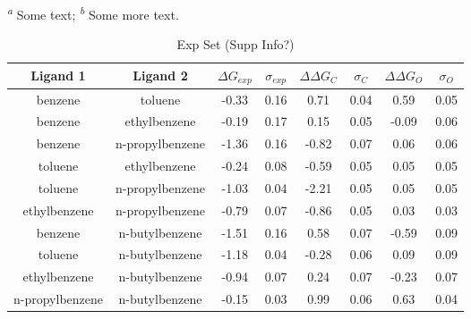 \documentclass[T4paper.tex]{subfiles}
\begin{document}
\begin{table}[!htb]
  \textsuperscript{\emph{a}} Some text;
  \textsuperscript{\emph{b}} Some more text.
\end{table}


\begin{table}[]
\centering
\caption{Exp Set (Supp Info?)}
\label{tbl:exp_set}
\begin{tabular}{|c|c|c|c|c|c|c|c|}
\hline
\textbf{Ligand 1} & \textbf{Ligand 2}  & \boldmath$\Delta G_{exp}$  & \boldmath$\sigma_{exp}$ & {\color[HTML]{800080} \boldmath$\Delta\Delta G_{C}$} & {\color[HTML]{800080} \boldmath$\sigma_{C}$} & {\color[HTML]{008000} \boldmath$\Delta\Delta G_{O}$} & {\color[HTML]{008000} \boldmath$\sigma_{O}$} \\ \hline
\cellcolor[HTML]{800080}benzene         & \cellcolor[HTML]{800080}toluene         & -0.33        & 0.16            & 0.71       & 0.04          & 0.59       & 0.05          \\ \hline
\cellcolor[HTML]{800080}benzene         & \cellcolor[HTML]{800080}ethylbenzene    & -0.19        & 0.17            & 0.15       & 0.05          & -0.09      & 0.06          \\ \hline
\cellcolor[HTML]{800080}benzene         & \cellcolor[HTML]{800080}n-propylbenzene & -1.36        & 0.16            & -0.82      & 0.07          & 0.06       & 0.06          \\ \hline
\cellcolor[HTML]{800080}toluene         & \cellcolor[HTML]{800080}ethylbenzene    & -0.24        & 0.08            & -0.59      & 0.05          & 0.05       & 0.05          \\ \hline
\cellcolor[HTML]{800080}toluene         & \cellcolor[HTML]{800080}n-propylbenzene & -1.03        & 0.04            & -2.21      & 0.05          & 0.05       & 0.05          \\ \hline
\cellcolor[HTML]{800080}ethylbenzene    & \cellcolor[HTML]{800080}n-propylbenzene & -0.79        & 0.07            & -0.86      & 0.05          & 0.03       & 0.03          \\ \hline
\cellcolor[HTML]{800080}benzene         & \cellcolor[HTML]{00FFFF}n-butylbenzene  & -1.51        & 0.16            & 0.58       & 0.07          & -0.59      & 0.09          \\ \hline
\cellcolor[HTML]{800080}toluene         & \cellcolor[HTML]{00FFFF}n-butylbenzene  & -1.18        & 0.04            & -0.28      & 0.06          & 0.09       & 0.09          \\ \hline
\cellcolor[HTML]{800080}ethylbenzene    & \cellcolor[HTML]{00FFFF}n-butylbenzene  & -0.94        & 0.07            & 0.24       & 0.07          & -0.23      & 0.07          \\ \hline
\cellcolor[HTML]{800080}n-propylbenzene & \cellcolor[HTML]{00FFFF}n-butylbenzene  & -0.15        & 0.03            & 0.99       & 0.06          & 0.63       & 0.04          \\ \hline
\end{tabular}
\end{table}
\end{document}
